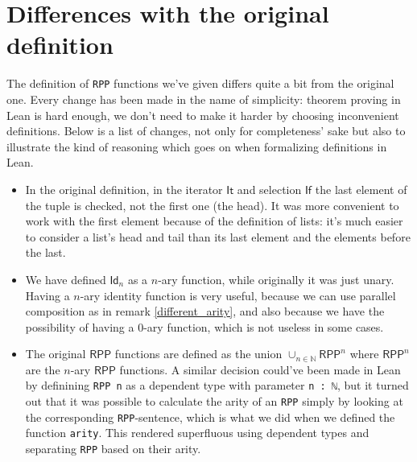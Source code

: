 \documentclass{book}
\theoremstyle{definition}
\theoremstyle{remark}
\theoremstyle{plain}
\newcommand{\NN}{\mathbb{N}}
\newcommand{\RPP}{\mathsf{RPP}}
\newcommand{\rppId}{\mathsf{Id}}
\newcommand{\rppIt}{\mathsf{It}}
\newcommand{\rppIf}{\mathsf{If}}
\begin{document}
\section{Differences with the original definition}
The definition of \lstinline{RPP} functions we've given differs quite a bit from the original one.
Every change has been made in the name of simplicity:
theorem proving in Lean is hard enough,
we don't need to make it harder by choosing inconvenient definitions.
Below is a list of changes, not only for completeness' sake but also to illustrate the kind of reasoning which goes on
when formalizing definitions in Lean.
\begin{itemize}
\item In the original definition,
in the iterator $\rppIt$ and selection $\rppIf$ the last element of the tuple is checked,
not the first one (the head).
It was more convenient to work with the first element because of the definition of lists:
it's much easier to consider a list's head and tail than its last element and the elements before the last.
\item We have defined $\rppId_n$ as a $n$-ary function, while originally it was just unary.
Having a $n$-ary identity function is very useful,
because we can use parallel composition as in remark \ref{different_arity},
and also because we have the possibility of having a $0$-ary function, which is not useless in some cases.
\item The original $\RPP$ functions are defined as the union $\cup_{n \in \NN}\RPP^n$
where $\RPP^n$ are the $n$-ary $\RPP$ functions.
A similar decision could've been made in Lean by definining \lstinline{RPP n} as a dependent type
with parameter \lstinline{n : ℕ},
but it turned out that it was possible to calculate the arity of an \lstinline{RPP} simply by looking at
the corresponding \lstinline{RPP}-sentence, which is what we did when we defined the function \lstinline{arity}.
This rendered superfluous using dependent types and separating \lstinline{RPP} based on their arity.


\end{itemize}
\end{document}
